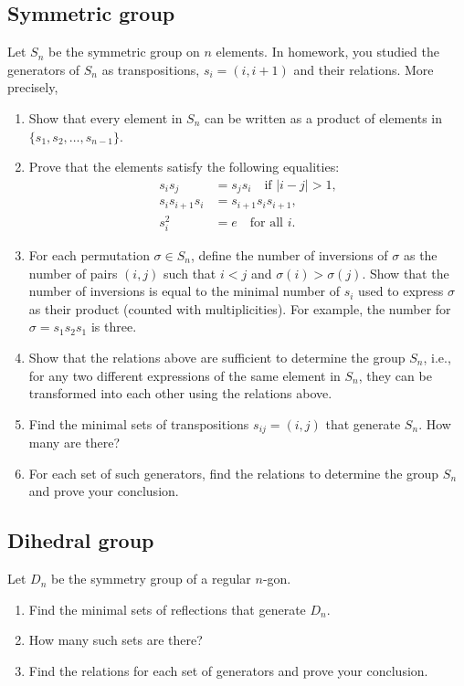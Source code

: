\documentclass[12pt]{article}
\theoremstyle{definition}
\theoremstyle{remark}
\begin{document}
\subsection{Symmetric group}
Let $S_n$ be the symmetric group on $n$ elements. In homework, you studied the generators of $S_n$ as transpositions, $s_i=(i,i+1)$ and their relations. More precisely, 
\begin{enumerate}
  \item Show that every element in $S_n$ can be written as a product of elements in $\{s_1, s_2, \ldots, s_{n-1}\}$.
  \item Prove that the elements satisfy the following equalities:
  \begin{align*}  
    s_i s_j &= s_j s_i \quad \text{if } |i - j| > 1, \\
    s_i s_{i+1} s_i&= s_{i+1} s_i s_{i+1}, \\
    s_i^2 &= e \quad \text{for all } i.
  \end{align*}

  \item For each permutation $\sigma\in S_n$, define the number of inversions of $\sigma$ as the number of pairs $(i,j)$ such that $i<j$ and $\sigma(i)>\sigma(j)$. Show that the number of inversions is equal to the minimal number of $s_i$ used to express $\sigma$ as their product (counted with multiplicities). For example, the number for $\sigma=s_1s_2s_1$ is three.

  \item Show that the relations above are sufficient to determine the group $S_n$, i.e., for any two different expressions of the same element in $S_n$, they can be transformed into each other using the relations above.
  
  \item Find the minimal sets of transpositions $s_{ij}=(i,j)$ that generate $S_n$. How many are there?
  \item For each set of such generators, find the relations to determine the group $S_n$ and prove your conclusion.
\end{enumerate}

\subsection{Dihedral group}
Let $D_n$ be the symmetry group of a regular $n$-gon. 
\begin{enumerate}
    \item Find the minimal sets of reflections that generate $D_n$.
    \item How many such sets are there?
    \item Find the relations for each set of generators and prove your conclusion.
\end{enumerate}
\end{document}
